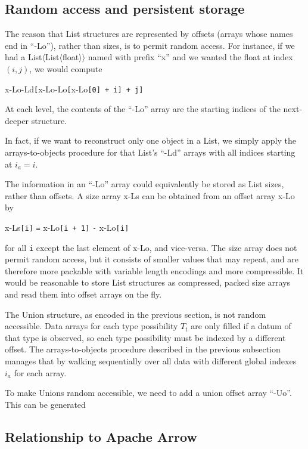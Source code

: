 \documentclass[10pt, conference, compsocconf]{IEEEtran}
\begin{document}
\subsection{Random access and persistent storage}

The reason that List structures are represented by offsets (arrays whose names end in ``-Lo''), rather than sizes, is to permit random access. For instance, if we had a List$\langle$List$\langle$float$\rangle\rangle$ named with prefix ``x'' and we wanted the float at index $(i, j)$, we would compute
\begin{center}
x-Lo-Ld{\tt [}x-Lo-Lo{\tt [}x-Lo{\tt [0] + i] + j]}
\end{center}
At each level, the contents of the ``-Lo'' array are the starting indices of the next-deeper structure.

In fact, if we want to reconstruct only one object in a List, we simply apply the arrays-to-objects procedure for that List's ``-Ld'' arrays with all indices starting at $i_a = i$.

The information in an ``-Lo'' array could equivalently be stored as List sizes, rather than offsets. A size array x-Ls can be obtained from an offset array x-Lo by
\begin{center}
x-Ls{\tt [i]} {\tt =} x-Lo{\tt [i + 1]} {\tt -} x-Lo{\tt [i]}
\end{center}
for all {\tt i} except the last element of x-Lo, and vice-versa. The size array does not permit random access, but it consists of smaller values that may repeat, and are therefore more packable with variable length encodings and more compressible. It would be reasonable to store List structures as compressed, packed size arrays and read them into offset arrays on the fly.

The Union structure, as encoded in the previous section, is not random accessible. Data arrays for each type possibility $T_t$ are only filled if a datum of that type is observed, so each type possibility must be indexed by a different offset. The arrays-to-objects procedure described in the previous subsection manages that by walking sequentially over all data with different global indexes $i_a$ for each array.

To make Unions random accessible, we need to add a union offset array ``-Uo''. This can be generated 





\subsection{Relationship to Apache Arrow}
\end{document}

